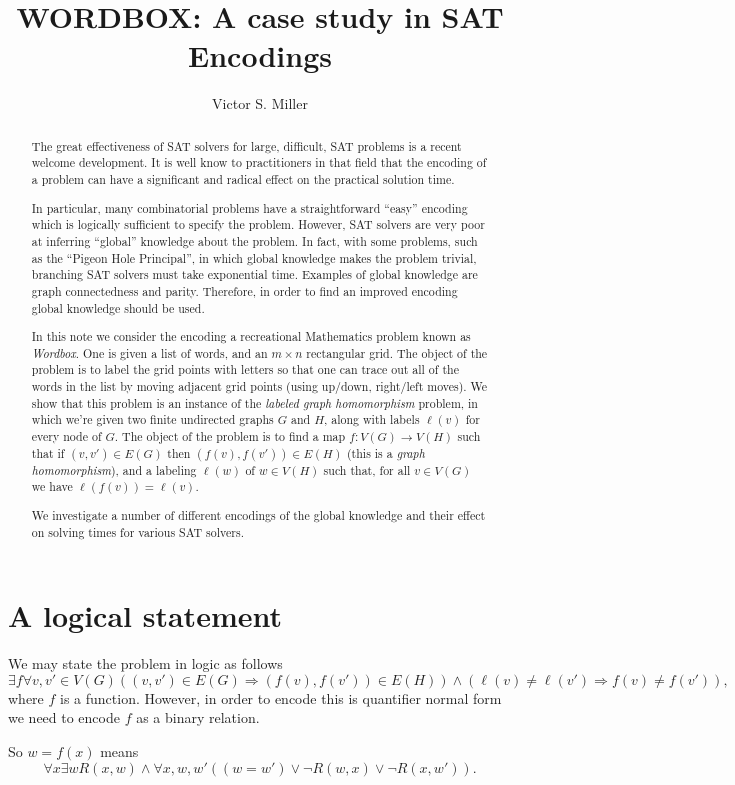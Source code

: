 \documentclass{article}
\title{WORDBOX: A case study in SAT Encodings}
\author{Victor S. Miller}
\affil{IDA Center for Communications Research, Princeton, NJ 08540
USA}
\begin{document}
\maketitle{}
\begin{abstract}
  The great effectiveness of SAT solvers for large, difficult, SAT
  problems is a recent welcome development.  It is well know to
  practitioners in that field that the encoding of a problem can have
  a significant and radical effect on the practical solution time.

  In particular, many combinatorial problems have a straightforward
  ``easy'' encoding which is logically sufficient to specify the
  problem.  However, SAT solvers are very poor at inferring ``global''
  knowledge about the problem.  In fact, with some problems, such as
  the ``Pigeon Hole Principal'', in which global knowledge makes the
  problem trivial, branching SAT solvers must take exponential time.
  Examples of global knowledge are graph connectedness and
  parity. Therefore, in order to find an improved encoding global
  knowledge should be used.

  In this note we consider the encoding a recreational Mathematics
  problem known as \emph{Wordbox}.  One is given a list of words, and
  an $m \times n$ rectangular grid.  The object of the problem is to
  label the grid points with letters so that one can trace out all of
  the words in the list by moving adjacent grid points (using up/down,
  right/left moves).  We show that this problem is an instance of the
  \emph{labeled graph homomorphism} problem, in which we're given two
  finite undirected graphs $G$ and $H$, along with labels $\ell(v)$ for
  every node of $G$.  The object of the problem is to find a map
  $f: V(G) \rightarrow V(H)$ such that if $(v,v') \in E(G)$ then
  $(f(v), f(v')) \in E(H)$ (this is a \emph{graph homomorphism}), and
  a labeling $\ell(w)$ of $w \in V(H)$ such that, for all $v \in V(G)$
  we have $\ell(f(v)) = \ell(v)$.

  We investigate a number of different encodings of the global
  knowledge and their effect on solving times for various SAT solvers.
\end{abstract}

\section{A logical statement}
\label{sec:logical-statement}

We may state the problem in logic as follows
\begin{equation}
  \label{eq:1}
  \exists f \forall v,v' \in V(G) ((v,v') \in E(G) \Rightarrow (f(v),
  f(v')) \in E(H)) \wedge (\ell(v) \ne \ell(v') \Rightarrow f(v) \ne f(v')),
\end{equation}
where $f$ is a function.  However, in order to encode this is
quantifier normal form we need to encode $f$ as a binary relation.

So $w=f(x)$ means
\begin{displaymath}
  \forall x \exists w R(x,w) \wedge \forall x,w,w' ((w = w') \vee
  \neg R(w,x) \vee \neg R(x,w')).
\end{displaymath}
\end{document}
